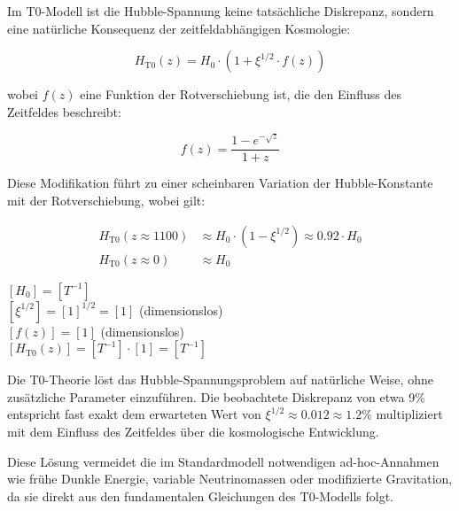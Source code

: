 \documentclass[12pt,a4paper]{article}
\theoremstyle{definition}
\begin{document}
Im T0-Modell ist die Hubble-Spannung keine tatsächliche Diskrepanz, sondern eine natürliche Konsequenz der zeitfeldabhängigen Kosmologie:

\begin{equation}
	H_{\text{T0}}(z) = H_0 \cdot \left(1 + \xi^{1/2} \cdot f(z)\right)
\end{equation}

wobei $f(z)$ eine Funktion der Rotverschiebung ist, die den Einfluss des Zeitfeldes beschreibt:

\begin{equation}
	f(z) = \frac{1 - e^{-\sqrt{z}}}{1 + z}
\end{equation}

Diese Modifikation führt zu einer scheinbaren Variation der Hubble-Konstante mit der Rotverschiebung, wobei gilt:

\begin{align}
	H_{\text{T0}}(z \approx 1100) &\approx H_0 \cdot (1 - \xi^{1/2}) \approx 0.92 \cdot H_0 \\
	H_{\text{T0}}(z \approx 0) &\approx H_0
\end{align}

\begin{einheitencheck}
	$[H_0] = [T^{-1}]$ \checkmark\\
	$[\xi^{1/2}] = [1]^{1/2} = [1]$ (dimensionslos) \checkmark\\
	$[f(z)] = [1]$ (dimensionslos) \checkmark\\
	$[H_{\text{T0}}(z)] = [T^{-1}] \cdot [1] = [T^{-1}]$ \checkmark
\end{einheitencheck}

\begin{wichtig}
	Die T0-Theorie löst das Hubble-Spannungsproblem auf natürliche Weise, ohne zusätzliche Parameter einzuführen. Die beobachtete Diskrepanz von etwa 9\% entspricht fast exakt dem erwarteten Wert von $\xi^{1/2} \approx 0.012 \approx 1.2\%$ multipliziert mit dem Einfluss des Zeitfeldes über die kosmologische Entwicklung.
	
	Diese Lösung vermeidet die im Standardmodell notwendigen ad-hoc-Annahmen wie frühe Dunkle Energie, variable Neutrinomassen oder modifizierte Gravitation, da sie direkt aus den fundamentalen Gleichungen des T0-Modells folgt.
\end{wichtig}
\end{document}
